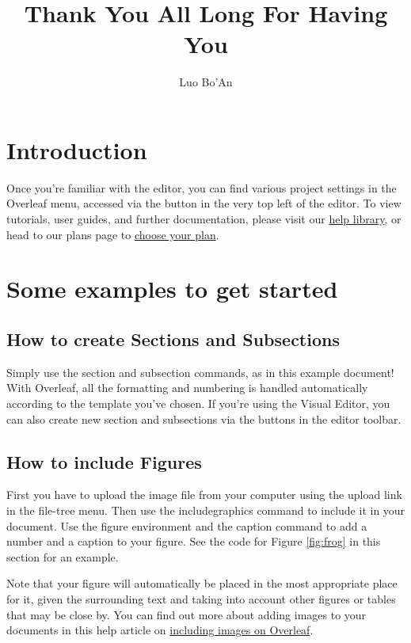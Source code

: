 \documentclass{article}
\title{Thank You All Long For Having You}
\author{Luo Bo'An }
\begin{document}
\maketitle

\begin{abstract}

\end{abstract}

\section{Introduction}



Once you're familiar with the editor, you can find various project settings in the Overleaf menu, accessed via the button in the very top left of the editor. To view tutorials, user guides, and further documentation, please visit our \href{https://www.overleaf.com/learn}{help library}, or head to our plans page to \href{https://www.overleaf.com/user/subscription/plans}{choose your plan}.

\section{Some examples to get started}

\subsection{How to create Sections and Subsections}

Simply use the section and subsection commands, as in this example document! With Overleaf, all the formatting and numbering is handled automatically according to the template you've chosen. If you're using the Visual Editor, you can also create new section and subsections via the buttons in the editor toolbar.

\subsection{How to include Figures}

First you have to upload the image file from your computer using the upload link in the file-tree menu. Then use the includegraphics command to include it in your document. Use the figure environment and the caption command to add a number and a caption to your figure. See the code for Figure \ref{fig:frog} in this section for an example.

Note that your figure will automatically be placed in the most appropriate place for it, given the surrounding text and taking into account other figures or tables that may be close by. You can find out more about adding images to your documents in this help article on \href{https://www.overleaf.com/learn/how-to/Including_images_on_Overleaf}{including images on Overleaf}.
\end{document}

